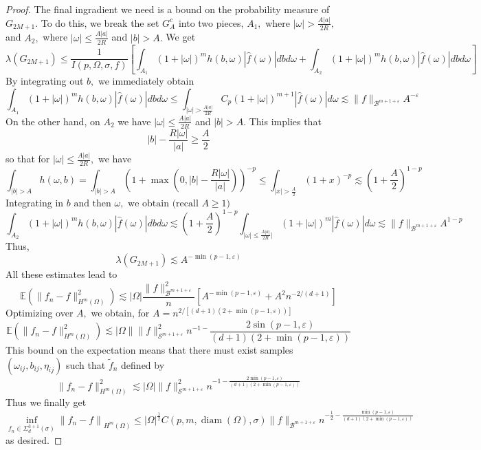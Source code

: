 \begin{proof}
The final ingradient we need is a bound on the probability measure of $G_{2M+1}.$ To do this, we break the set $G_{A}^{c}$ into two pieces, $A_{1},$ where $|\omega|>\frac{A|a|}{2 R},$ and $A_{2},$ where $|\omega| \leq \frac{A|a|}{2 R}$ and $|b|>A .$ We get
\[
\lambda(G_{2M+1} ) \leq \frac{1}{I(p, \Omega, \sigma, f)}\left[\int_{A_{1}}(1+|\omega|)^{m} h(b, \omega)|\hat{f}(\omega)| d b d \omega+\int_{A_{2}}(1+|\omega|)^{m} h(b, \omega)|\hat{f}(\omega)| d b d \omega \right]
\]
By integrating out $b,$ we immediately obtain
\[
\int_{A_{1}}(1+|\omega|)^{m} h(b, \omega)|\hat{f}(\omega)| d b d \omega \leq \int_{|\omega|>\frac{A|a|}{2 R}} C_{p}(1+|\omega|)^{m+1}|\hat{f}(\omega)| d \omega \lesssim\|f\|_{\mathscr{B}^{m+1+\varepsilon} }A^{-\varepsilon}
\]
On the other hand, on $A_{2}$ we have $|\omega| \leq \frac{A|a|}{2 R}$ and $|b|>A .$ This implies that
\[
|b|-\frac{R|\omega|}{|a|} \geq \frac{A}{2}
\]
so that for $|\omega| \leq \frac{A|a|}{2 R},$ we have
\[
\int_{|b|>A} h(\omega, b)=\int_{|b|>A}\left(1+\max \left(0,|b|-\frac{R|\omega|}{|a|}\right)\right)^{-p} \leq \int_{|x|>\frac{A}{2}}(1+x)^{-p} \lesssim\left(1+\frac{A}{2}\right)^{1-p}
\]
Integrating in $b \text { and then } \omega, \text { we obtain (recall } A \geq 1)$
\[
\int_{A_{2}}(1+|\omega|)^{m} h(b, \omega)|\hat{f}(\omega)| d b d \omega \lesssim\left(1+\frac{A}{2}\right)^{1-p} \int_{|\omega| \leq \frac{A|a|}{2 R} |}(1+|\omega|)^{m}|\hat{f}(\omega)| d \omega \lesssim\|f\|_{\mathscr{B}^{m+1+\varepsilon}} A^{1-p}
\]
Thus,
\[
\lambda(G_{2M+1} )  \lesssim A^{-\min (p-1, \varepsilon)}
\]
All these estimates lead to
\[
\mathbb{E}(\|f_{n}-f\|_{H^{m}(\Omega)}^{2}) \lesssim
|\Omega| \frac{\|f\|_{\mathscr{B}^{m+1+\varepsilon}}^{2}}{n}\left[A^{-\min (p-1, \varepsilon)}+A^{2} n^{-2 /(d+1)}\right]
\]
Optimizing over $A,$ we obtain, for $A=n^{2 /[(d+1)(2+\min (p-1, \varepsilon))]}$
\[
\mathbb{E} (\|f_{n}-f\|_{H^{m}(\Omega)}^{2} ) \lesssim 
| \Omega\|\| f \|_{\mathscr{S}^{m+1+\varepsilon}}^{2} n^{-1-} \frac{2 \sin (p-1, \varepsilon)}{(d+1)(2+\min (p-1, \varepsilon))}
\]
This bound on the expectation means that there must exist samples $\left(\omega_{i j}, b_{i j}, \eta_{i j}\right)$ such that $\tilde{f}_{n}$ defined by
\[
\|f_{n}-f \|_{H^{m}(\Omega)}^{2} \lesssim
|\Omega|\|f\|_{\mathscr{S}^{m+1+\varepsilon}}^{2} n^{-1-\frac{2 \min (p-1, \varepsilon)}{(d+1)(2+\min (p-1, \varepsilon))}}
\]
Thus we finally get
\[
\inf _{f_{n} \in \Sigma_{d}^{3+1}(\sigma)}\left\|f_{n}-f\right\|_{H^{m}(\Omega)} \leq|\Omega|^{\frac{1}{2}} C(p, m, \operatorname{diam}(\Omega), \sigma)\|f\|_{\mathscr{B}^{m+1+\varepsilon} }n^{{-\frac{1}{2}}-\frac{\min (p-1, \varepsilon)}{(d+1)(2+\min (p-1, \varepsilon))}}
\]
as desired.


\end{proof}


